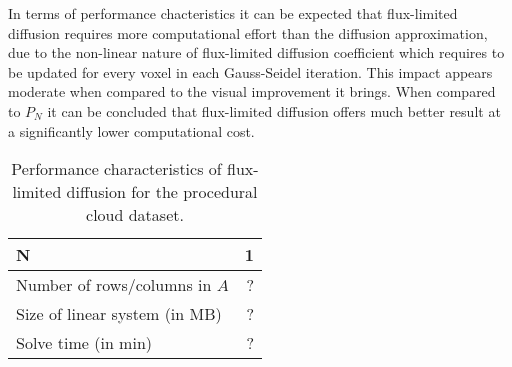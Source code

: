 In terms of performance chacteristics it can be expected that flux-limited diffusion requires more computational effort than the diffusion approximation, due to the non-linear nature of flux-limited diffusion coefficient which requires to be updated for every voxel in each Gauss-Seidel iteration. This impact appears moderate when compared to the visual improvement it brings. When compared to $P_N$ it can be concluded that flux-limited diffusion offers much better result at a significantly lower computational cost.
\begin{table}[!h]
	\centering
	\caption[table test what is this doing here?]{Performance characteristics of flux-limited diffusion for the procedural cloud dataset.}
	\label{tab:results_cloud}
	\begin{tabular}{l r}
    \hline
	\textbf{N}
    & 1
    \\
    \hline
    Number of rows/columns in $A$
    & ?
    \\
    Size of linear system (in MB)
    & ?
    \\
    Solve time (in min)
    & ?
	\end{tabular}
\end{table}

